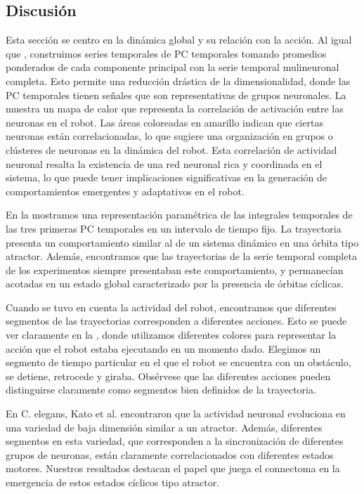 \subsection{Discusión}

Esta sección se centro en  la dinámica global y su relación con la acción. Al igual que \cite{kato_global_2015}, construimos series temporales de PC temporales tomando promedios ponderados de cada componente principal con la serie temporal mulineuronal completa. Esto permite una reducción drástica de la dimensionalidad, donde las PC temporales tienen señales que son representativas de grupos neuronales. La  muestra un mapa de calor que representa la correlación de activación entre las neuronas en el robot. Las áreas coloreadas en amarillo indican que ciertas neuronas están correlacionadas, lo que sugiere una organización en grupos o clústeres de neuronas en la dinámica del robot. Esta correlación de actividad neuronal resalta la existencia de una red neuronal rica y coordinada en el sistema, lo que puede tener implicaciones significativas en la generación de comportamientos emergentes y adaptativos en el robot.

En la   mostramos una representación paramétrica de las integrales temporales de las tres primeras PC temporales en un intervalo de tiempo fijo. La trayectoria presenta un comportamiento similar al de un sistema dinámico en una órbita tipo atractor. Además, encontramos que las trayectorias de la serie temporal completa de los experimentos siempre presentaban este comportamiento, y permanecían acotadas en un estado global caracterizado por la presencia de órbitas cíclicas.

Cuando se tuvo en cuenta la actividad del robot, encontramos que diferentes segmentos de las trayectorias corresponden a diferentes acciones. Esto se puede ver claramente en la , donde utilizamos diferentes colores para representar la acción que el robot estaba ejecutando en un momento dado. Elegimos un segmento de tiempo particular en el que el robot se encuentra con un obstáculo, se detiene, retrocede y giraba. Obsérvese que las diferentes acciones pueden distinguirse claramente como segmentos bien definidos de la trayectoria.

En C. elegans, Kato et al. \cite{kato_global_2015} encontraron que la actividad neuronal evoluciona en una variedad de baja dimensión similar a un atractor. Además, diferentes segmentos en esta variedad, que corresponden a la sincronización de diferentes grupos de neuronas, están claramente correlacionados con diferentes estados motores. Nuestros resultados destacan el papel que juega el connectoma en la emergencia de estos estados cíclicos tipo atractor.




